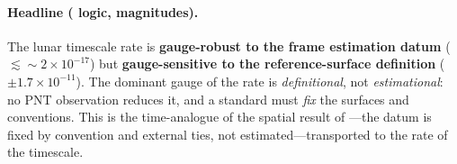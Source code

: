\paragraph{Headline (\Proven{} logic, \Modelled{} magnitudes).}
The lunar timescale rate is \textbf{gauge-robust to the frame estimation datum}
($\lesssim\!\sim\!2\times10^{-17}$) but \textbf{gauge-sensitive to the reference-surface
definition} ($\pm1.7\times10^{-11}$). The dominant gauge of the rate is
\emph{definitional}, not \emph{estimational}: no PNT observation reduces it, and a standard
must \emph{fix} the surfaces and conventions. This is the time-analogue of the spatial
result of \citep{baweja2026datum}---the datum is fixed by convention and external ties, not
estimated---transported to the rate of the timescale.

